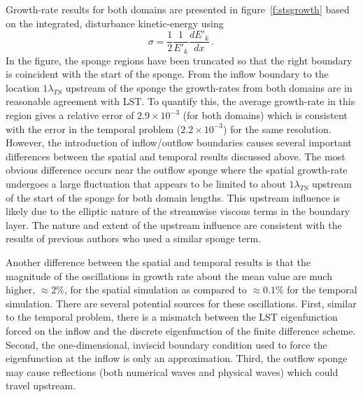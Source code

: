 Growth-rate results for both domains are presented in figure~\ref{f:stsgrowth}
based on the integrated, disturbance kinetic-energy using
%
\begin{equation}
  \sigma = \frac{1}{2} \frac{1}{E'_k} \frac{dE'_k}{dx} \period
\end{equation}
%
In the figure, the sponge regions have been truncated so that the right
boundary is coincident with the start of the sponge.  From the inflow boundary
to the location $1 \lambda_{TS}$ upstream of the sponge the growth-rates from
both domains are in reasonable agreement with LST.  To quantify this, the
average growth-rate in this region gives a relative error of $2.9\times
10^{-3}$ (for both domains) which is consistent with the error in the temporal
problem ($2.2\times 10^{-3}$) for the same resolution.  However, the
introduction of inflow/outflow boundaries causes several important differences
between the spatial and temporal results discussed above.  The most obvious
difference occurs near the outflow sponge where the spatial growth-rate
undergoes a large fluctuation that appears to be limited to about $1
\lambda_{TS}$ upstream of the start of the sponge for both domain
lengths. This upstream influence is likely due to the elliptic nature of the
streamwise viscous terms in the boundary layer.  The nature and extent of the
upstream influence are consistent with the results of previous authors
\cite{GuAd:93,Adams:94} who used a similar sponge term.

Another difference between the spatial and temporal results is that the
magnitude of the oscillations in growth rate about the mean value are much
higher, $\approx 2\%$, for the spatial simulation as compared to $\approx
0.1\%$ for the temporal simulation.  There are several potential sources for
these oscillations.  First, similar to the temporal problem, there is a
mismatch between the LST eigenfunction forced on the inflow and the discrete
eigenfunction of the finite difference scheme.  Second, the one-dimensional,
inviscid boundary condition used to force the eigenfunction at the inflow is
only an approximation.  Third, the outflow sponge may cause reflections (both
numerical waves and physical waves) which could travel upstream.

